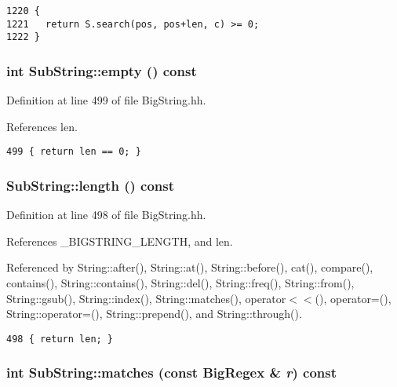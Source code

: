 \footnotesize\begin{verbatim}1220 {
1221   return S.search(pos, pos+len, c) >= 0;
1222 }
\end{verbatim}\normalsize 
{}
\subsubsection{\setlength{\rightskip}{0pt plus 5cm}int Sub\-String::empty () const\hspace{0.3cm}{\tt  [inline]}}\label{classSubString_a12}




Definition at line 499 of file Big\-String.hh.

References len.



\footnotesize\begin{verbatim}499 { return len == 0; }
\end{verbatim}\normalsize 
{}
\subsubsection{ Sub\-String::length () const\hspace{0.3cm}{\tt  [inline]}}\label{classSubString_a11}




Definition at line 498 of file Big\-String.hh.

References \_\-BIGSTRING\_\-LENGTH, and len.

Referenced by String::after(), String::at(), String::before(), cat(), compare(), contains(), String::contains(), String::del(), String::freq(), String::from(), String::gsub(), String::index(), String::matches(), operator$<$$<$(), operator=(), String::operator=(), String::prepend(), and String::through().



\footnotesize\begin{verbatim}498 { return len; }
\end{verbatim}\normalsize 
{}
\subsubsection{\setlength{\rightskip}{0pt plus 5cm}int Sub\-String::matches (const {\bf Big\-Regex} \& {\em r}) const\hspace{0.3cm}{\tt  [inline]}}\label{classSubString_a10}




